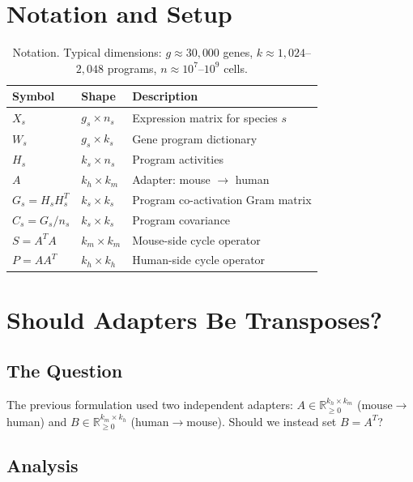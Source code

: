 \documentclass[10pt,twocolumn,letterpaper]{article}
\begin{document}
\section{Notation and Setup}

\begin{table}[h]
\centering\small
\begin{tabular}{@{}lll@{}}
\toprule
Symbol & Shape & Description \\
\midrule
$X_s$ & $g_s \times n_s$ & Expression matrix for species $s$ \\
$W_s$ & $g_s \times k_s$ & Gene program dictionary \\
$H_s$ & $k_s \times n_s$ & Program activities \\
$A$ & $k_h \times k_m$ & Adapter: mouse $\to$ human \\
$G_s = H_s H_s^T$ & $k_s \times k_s$ & Program co-activation Gram matrix \\
$C_s = G_s / n_s$ & $k_s \times k_s$ & Program covariance \\
$S = A^T A$ & $k_m \times k_m$ & Mouse-side cycle operator \\
$P = A A^T$ & $k_h \times k_h$ & Human-side cycle operator \\
\bottomrule
\end{tabular}
\caption{Notation. Typical dimensions: $g \approx 30{,}000$ genes,
$k \approx 1{,}024$--$2{,}048$ programs, $n \approx 10^7$--$10^9$ cells.}
\end{table}

\section{Should Adapters Be Transposes?}

\subsection{The Question}

The previous formulation used two independent adapters:
$A \in \mathbb{R}_{\geq 0}^{k_h \times k_m}$ (mouse$\to$human) and
$B \in \mathbb{R}_{\geq 0}^{k_m \times k_h}$ (human$\to$mouse). Should we
instead set $B = A^T$?

\subsection{Analysis}
\end{document}
